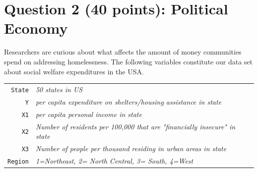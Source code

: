\documentclass[12pt,letterpaper]{article}
\begin{document}
\newpage

	\section*{Question 2 (40 points): Political Economy}

\noindent Researchers are curious about what affects the amount of money communities spend on addressing homelessness. The following variables constitute our data set about social welfare expenditures in the USA. \\
\vspace{.5cm}


\begin{tabular}{r|l}
	\texttt{State} &\emph{50 states in US} \\
	\texttt{Y} & \emph{per capita expenditure on shelters/housing assistance in state}\\
	\texttt{X1} &\emph{per capita personal income in state} \\
	\texttt{X2} &  \emph{Number of residents per 100,000 that are "financially insecure" in state}\\
	\texttt{X3} &  \emph{Number of people per thousand residing in urban areas in state} \\
	\texttt{Region} &  \emph{1=Northeast, 2= North Central, 3= South, 4=West} \\
\end{tabular}
\end{document}
